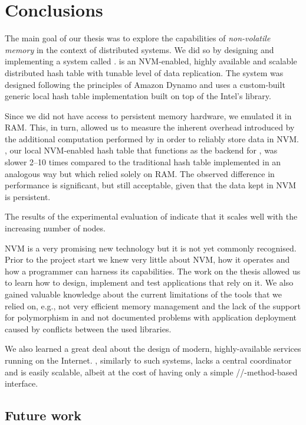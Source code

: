 \chapter{Conclusions} \label{Conclusion}

The main goal of our thesis was to explore the capabilities of \emph{non-volatile memory} in the context of distributed systems. We did so by designing and implementing a system called \DHTS.
\DHTS is an NVM-enabled, highly available and scalable distributed hash table with tunable level of data replication. The system was designed following the principles of Amazon Dynamo and uses a custom-built generic local hash table implementation built on top of the Intel's \libpmemobj library.

Since we did not have access to persistent memory hardware, we emulated it in RAM. This, in turn, allowed us to measure the inherent overhead introduced by the additional computation performed by \libpmemobj in order to reliably store data in NVM. \PHT, our local NVM-enabled hash table that functions as the backend for \DHTS, was slower 2--10 times compared to the traditional hash table implemented in an analogous way but which relied solely on RAM. The observed difference in performance is significant, but still acceptable, given that the data kept in NVM is persistent. 

The results of the experimental evaluation of \DHTS indicate that it scales well with the increasing number of nodes.

NVM is a very promising new technology but it is not yet commonly recognised. Prior to the project start we knew very little about NVM, how it operates and how a programmer can harness its capabilities. The work on the thesis allowed us to learn how to design, implement and test applications that rely on it. We also gained valuable knowledge about the current limitations of the tools that we relied on, e.g., not very efficient memory management and the lack of the support for polymorphism in \libpmemobjcpp and not documented problems with application deployment caused by conflicts between the used libraries.

We also learned a great deal about the design of modern, highly-available services running on the Internet. \DHTS, similarly to such systems, lacks a central coordinator and is easily scalable, albeit at the cost of having only a simple \insertMethod/\getMethod/\removeMethod-method-based interface.

\section{Future work}

